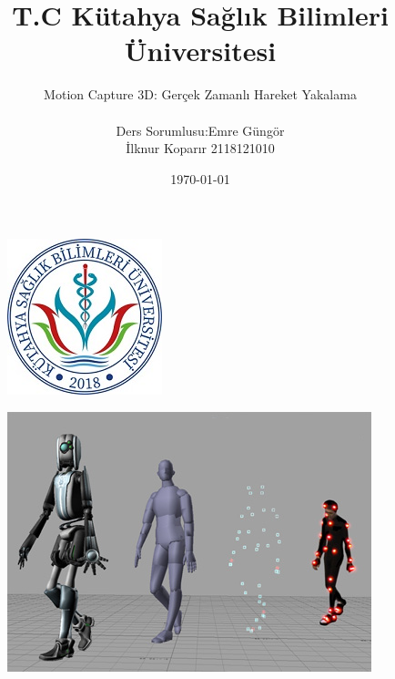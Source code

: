 \documentclass[12pt, a4paper]{article}
\begin{document}
\title{\textbf { T.C Kütahya Sağlık Bilimleri Üniversitesi}}
\begin{figure}
	\centering
	\includegraphics[width=7 cm  ,height=6 cm  ]{logo.jpg}
	


\end{figure}
\author{Motion Capture 3D: Gerçek Zamanlı Hareket Yakalama \\ \\  Ders Sorumlusu:Emre Güngör \\  İlknur Koparır 2118121010  }

\date{\today}

\maketitle
\begin{figure}
	\centering
	\includegraphics[width=15 cm  ,height= 5 cm  ]{Activemarker2.png}
	
\end{figure}

\newpage
\end{document}
